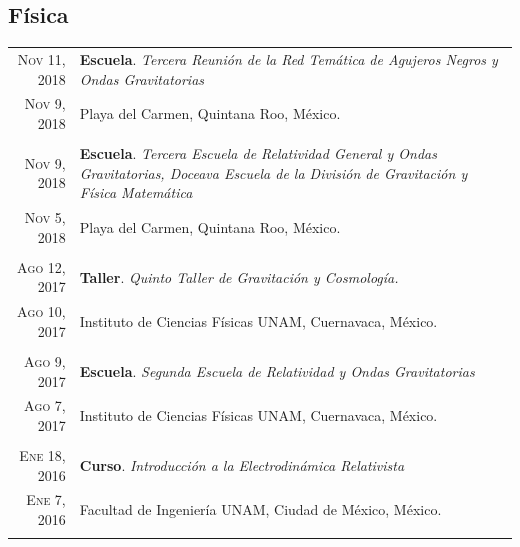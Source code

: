\documentclass[a4paper,10pt]{article} %
\begin{document}
\subsection*{Física}
\begin{tabular}{r|p{11cm}}
	
	\textsc{Nov 11, 2018} & \small \textbf{Escuela}. \textit{Tercera Reunión de la Red Temática de Agujeros Negros y Ondas Gravitatorias}\\
	\textsc{Nov 9, 2018} &\small Playa del Carmen, Quintana Roo, México.\\
	\multicolumn{2}{c}{} \\
	
	
	\textsc{Nov 9, 2018} & \small \textbf{Escuela}. \textit{Tercera Escuela de Relatividad General y Ondas Gravitatorias, Doceava Escuela de la División de Gravitación y Física Matemática}\\
	\textsc{Nov 5, 2018} &\small Playa del Carmen, Quintana Roo, México.\\
	\multicolumn{2}{c}{} \\
	
	
	\textsc{Ago 12, 2017} & \small \textbf{Taller}. \textit{Quinto Taller de Gravitación y Cosmología.}\\
	\textsc{Ago 10, 2017} & \small Instituto de Ciencias Físicas UNAM, Cuernavaca, México.\\
	\multicolumn{2}{c}{} \\
	
	
	\textsc{Ago 9, 2017} & \small \textbf{Escuela}. \textit{Segunda Escuela de Relatividad y Ondas Gravitatorias}\\
	\textsc{Ago 7, 2017} & \small Instituto de Ciencias Físicas UNAM, Cuernavaca, México.\\
	\multicolumn{2}{c}{} \\
	
	
	\textsc{Ene 18, 2016} & \small \textbf{Curso}. \textit{Introducción a la Electrodinámica Relativista}\\
	\textsc{Ene 7, 2016} & \small Facultad de Ingeniería UNAM, Ciudad de México, México.\\
	\multicolumn{2}{c}{} \\
	
\end{tabular}
\end{document}
